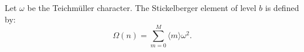 Let $\omega$ be the Teichm\"uller character. The Stickelberger element of level $b$ is defined by:
$$\Omega(n) = \sum_{m=0}^{M} \langle m \rangle \omega^2.$$
